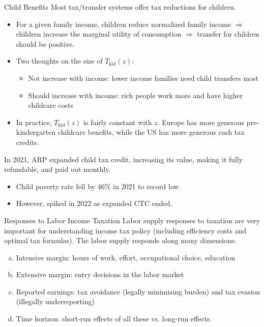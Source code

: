 \documentclass[10pt]{extarticle}
\begin{document}
  \begin{problem}{Child Benefits}
    Most tax/transfer systems offer tax reductions for children.
    \begin{itemize}
      \item For a given family income, children reduce normalized family income $\Rightarrow$ children increase the marginal utility of consumption $\Rightarrow$ transfer for children should be positive.
      \item Two thoughts on the size of $T_{\text{kid}}(z)$:
        \begin{itemize}
          \item Not increase with income: lower income families need child transfers most
          \item Should increase with income: rich people work more and have higher childcare costs
        \end{itemize}
      \item In practice, $T_{\text{kid}}(z)$ is fairly constant with $z$. Europe has more generous pre-kindergarten childcare benefits, while the US has more generous cash tax credits.
    \end{itemize}
    In 2021, ARP expanded child tax credit, increasing its value, making it fully refundable, and paid out monthly.
    \begin{itemize}
      \item Child poverty rate fell by 46\% in 2021 to record low.
      \item However, spiked in 2022 as expanded CTC ended.
    \end{itemize}
  \end{problem}
  \begin{problem}{Responses to Labor Income Taxation}
    Labor supply responses to taxation are very important for understanding income tax policy (including efficiency costs and optimal tax formulas). The labor supply responds along many dimensions:
    \begin{enumerate}[(a)]
      \item Intensive margin: hours of work, effort, occupational choice, education
      \item Extensive margin: entry decisions in the labor market
      \item Reported earnings: tax avoidance (legally minimizing burden) and tax evasion (illegally underreporting)
      \item Time horizon: short-run effects of all these vs. long-run effects.
    \end{enumerate}
  \end{problem}
\end{document}
